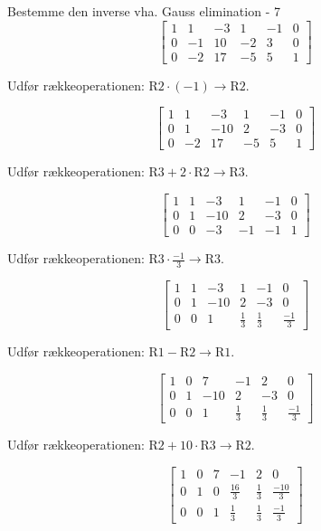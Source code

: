 \documentclass{article}
\begin{document}
\begin{exercise}{Bestemme den inverse vha. Gauss elimination - 7}
\hint
\[
\left[\begin{array}{ccc|ccc}
1 & 1 & -3 & 1 & -1 & 0 \\
0 & -1 & 10 & -2 & 3 & 0 \\
0 & -2 & 17 & -5 & 5 & 1
\end{array} \right]
\]

\hint
Udfør rækkeoperationen: $\text{R2} \cdot (-1) \to \text{R2}$.

\hint
\[
\left[\begin{array}{ccc|ccc}
1 & 1 & -3 & 1 & -1 & 0 \\
0 & 1 & -10 & 2 & -3 & 0 \\
0 & -2 & 17 & -5 & 5 & 1
\end{array} \right]
\]

\hint
Udfør rækkeoperationen: $\text{R3} + 2 \cdot \text{R2} \to \text{R3}$.

\hint
\[
\left[\begin{array}{ccc|ccc}
1 & 1 & -3 & 1 & -1 & 0 \\
0 & 1 & -10 & 2 & -3 & 0 \\
0 & 0 & -3 & -1 & -1 & 1
\end{array} \right]
\]

\hint
Udfør rækkeoperationen: $\text{R3} \cdot \frac{-1}{3} \to \text{R3}$.

\hint
\[
\left[\begin{array}{ccc|ccc}
1 & 1 & -3 & 1 & -1 & 0 \\
0 & 1 & -10 & 2 & -3 & 0 \\
0 & 0 & 1 & \frac{1}{3} & \frac{1}{3} & \frac{-1}{3}
\end{array} \right]
\]

\hint
Udfør rækkeoperationen: $\text{R1} - \text{R2} \to \text{R1}$.

\hint
\[
\left[\begin{array}{ccc|ccc}
1 & 0 & 7 & -1 & 2 & 0 \\
0 & 1 & -10 & 2 & -3 & 0 \\
0 & 0 & 1 & \frac{1}{3} & \frac{1}{3} & \frac{-1}{3}
\end{array} \right]
\]

\hint
Udfør rækkeoperationen: $\text{R2} + 10 \cdot \text{R3} \to \text{R2}$.

\hint
\[
\left[\begin{array}{ccc|ccc}
1 & 0 & 7 & -1 & 2 & 0 \\
0 & 1 & 0 & \frac{16}{3} & \frac{1}{3} & \frac{-10}{3} \\
0 & 0 & 1 & \frac{1}{3} & \frac{1}{3} & \frac{-1}{3}
\end{array} \right]
\]


\end{exercise}
\end{document}
